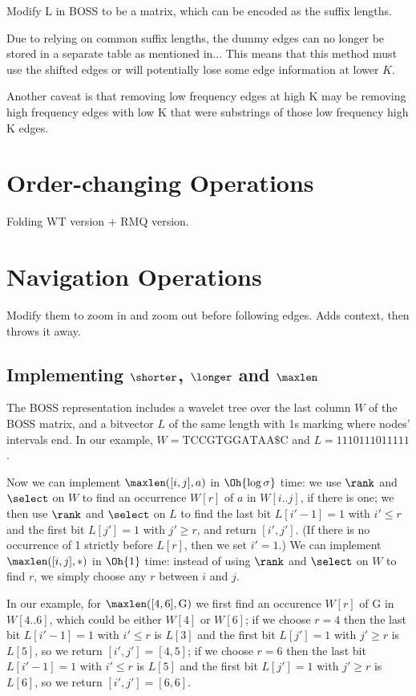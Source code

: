 Modify L in BOSS to be a matrix, which can be encoded as the suffix lengths.

Due to relying on common suffix lengths, the dummy edges can no longer be stored in
a separate table as mentioned in... This means that this method must use the shifted edges
or will potentially lose some edge information at lower $K$.

Another caveat is that removing low frequency edges at high K may be removing high frequency edges
with low K that were substrings of those low frequency high K edges.

\section{Order-changing Operations}
Folding
WT version + RMQ version.

\section{Navigation Operations}
Modify them to zoom in and zoom out before following edges. Adds context, then throws it away.

\subsection{Implementing $\shorter$, $\longer$ and $\maxlen$}
\label{sec:implementing}

The BOSS representation includes a wavelet tree over the last column $W$ of the BOSS matrix, and a bitvector $L$ of the same length with 1s marking where nodes' intervals end.  In our example, \(W = \mathrm{TCCGTGGATAA\$C}\) and \(L = 1110111011111\).

Now we can implement \(\maxlen([i, j], a)\) in $\Oh{\log \sigma}$ time: we use $\rank$ and $\select$ on $W$ to find an occurrence \(W [r]\) of $a$ in \(W [i..j]\), if there is one; we then use $\rank$ and $\select$ on $L$ to find the last bit \(L [i' - 1] = 1\) with \(i' \leq r\) and the first bit \(L [j'] = 1\) with \(j' \geq r\), and return \([i', j']\).  (If there is no occurrence of 1 strictly before \(L [r]\), then we set \(i' = 1\).)  We can implement \(\maxlen([i, j], *)\) in $\Oh{1}$ time: instead of using $\rank$ and $\select$ on $W$ to find $r$, we simply choose any $r$ between $i$ and $j$.

In our example, for \(\maxlen([4, 6], \mathrm{G})\) we first find an occurence \(W [r]\) of G in \(W [4..6]\), which could be either \(W [4]\) or \(W [6]\); if we choose \(r = 4\) then the last bit \(L [i' - 1] = 1\) with \(i' \leq r\) is \(L [3]\) and the first bit \(L [j'] = 1\) with \(j' \geq r\) is \(L [5]\), so we return \([i', j'] = [4, 5]\); if we choose \(r = 6\) then the last bit \(L [i' - 1] = 1\) with \(i' \leq r\) is \(L [5]\) and the first bit \(L [j'] = 1\) with \(j' \geq r\) is \(L [6]\), so we return \([i', j'] = [6, 6]\).

